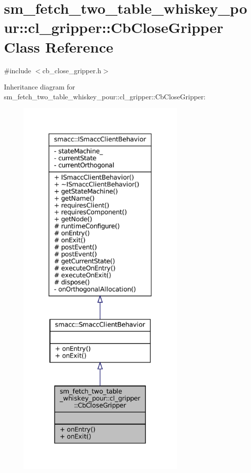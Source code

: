 \hypertarget{classsm__fetch__two__table__whiskey__pour_1_1cl__gripper_1_1CbCloseGripper}{}\section{sm\+\_\+fetch\+\_\+two\+\_\+table\+\_\+whiskey\+\_\+pour\+:\+:cl\+\_\+gripper\+:\+:Cb\+Close\+Gripper Class Reference}
\label{classsm__fetch__two__table__whiskey__pour_1_1cl__gripper_1_1CbCloseGripper}


{\ttfamily \#include $<$cb\+\_\+close\+\_\+gripper.\+h$>$}



Inheritance diagram for sm\+\_\+fetch\+\_\+two\+\_\+table\+\_\+whiskey\+\_\+pour\+:\+:cl\+\_\+gripper\+:\+:Cb\+Close\+Gripper\+:
\nopagebreak
\begin{figure}[H]
\begin{center}
\leavevmode
\includegraphics[height=550pt]{classsm__fetch__two__table__whiskey__pour_1_1cl__gripper_1_1CbCloseGripper__inherit__graph}
\end{center}
\end{figure}


